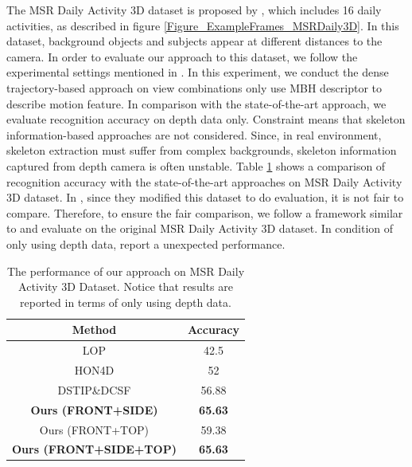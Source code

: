 \documentclass[final,3p,times,twocolumn]{elsarticle}
\begin{document}
The  MSR Daily Activity 3D dataset is proposed by \cite{wang2012mining}, which includes 16 daily activities, as described in figure \ref{Figure_ExampleFrames_MSRDaily3D}.
In this dataset, background objects and subjects appear at different distances to the camera.
In order to evaluate our approach to this dataset, we follow the experimental settings mentioned in \cite{wang2012mining}.
In this experiment, we conduct the dense trajectory-based approach on view combinations only use MBH descriptor to describe motion feature.
In comparison with the state-of-the-art approach, we evaluate recognition accuracy on depth data only.
Constraint means that skeleton information-based approaches are not considered.
Since, in real environment, skeleton extraction must suffer from complex backgrounds, skeleton information captured from depth camera is often unstable.
Table \ref{lbl:Table_Daily3D} shows a comparison of recognition accuracy with the state-of-the-art approaches on MSR Daily Activity 3D dataset.
In \cite{xia2013spatio}, since they modified this dataset to do evaluation, it is not fair to compare.
Therefore, to ensure the fair comparison, we follow a framework similar to \cite{xia2013spatio} and evaluate on the original MSR Daily Activity 3D dataset.
In condition of only using depth data, \cite{wang2012mining, oreifej2013hon4d, xia2013spatio} report a unexpected performance.
 
\begin{table}[h]
 	\begin{center}
 		\begin{tabular}{c|c}
 		
 		{\bf Method} & {\bf Accuracy} \\
 		\hline
       LOP \cite{wang2012mining} &       42.5 \\
 		
     HON4D \cite{oreifej2013hon4d} &         52 \\
 		
 		DSTIP\&DCSF \cite{xia2013spatio} &      56.88 \\
 		\hline
 		\bf Ours (FRONT+SIDE) & \bf 65.63 \\
 		Ours (FRONT+TOP) & 59.38 \\
 		\bf Ours (FRONT+SIDE+TOP) & \bf 65.63 \\
 		\end{tabular}
 	\end{center}
 	\caption{\label{lbl:Table_Daily3D}The performance of our approach on MSR Daily Activity 3D Dataset. Notice that results are reported in terms of only using depth data.}
\end{table}
 
\end{document}
